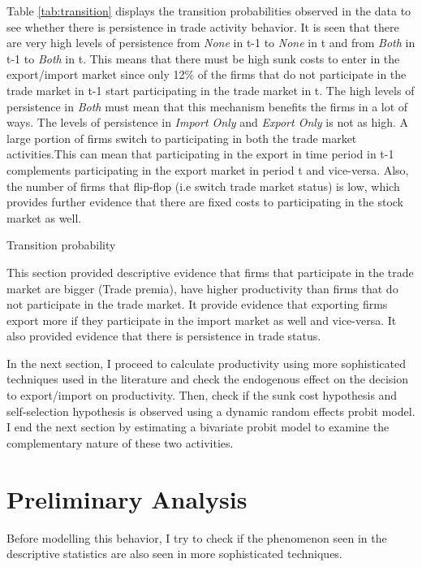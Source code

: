 \documentclass[11pt]{article}
\begin{document}
Table \ref{tab:transition} displays the transition probabilities
observed in the data to see whether there is persistence in trade
activity behavior. It is seen that there are very high levels of persistence from
\textit{None} in t-1 to \textit{None} in t  and from \textit{Both} in
t-1 to \textit{Both} in t. This means that there must be high sunk
costs to enter in the export/import market since only 12\% of the
firms  that do not participate in the trade market in t-1 start
participating in the trade market in t. The high levels of persistence
in \textit{Both} must mean that this mechanism benefits the firms in a
lot of ways. The levels of persistence in \textit{Import Only} and \textit{Export Only}  is not as high. A large
portion of firms switch to participating in both the trade market
activities.This can mean that participating in the export in time
period in t-1 complements participating in the export market in period
t and vice-versa. Also, the number of firms that flip-flop (i.e switch
trade market status) is low, which provides further evidence that there are fixed costs
to participating in the stock market as well. 
\begin{center}
\begin{table}[!htp]
\caption{Transition probability}
\label{tab:transition}

\end{table}
\end{center}


This section provided descriptive evidence that firms that participate
in the trade market are bigger (Trade premia), have higher
productivity than firms that do not participate in the trade
market. It provide evidence that exporting firms export more if they
participate in the import market as well and vice-versa. It also
provided evidence that there is persistence in trade status. 

In the next section, I proceed to calculate productivity using more
sophisticated techniques used in the literature and check the endogenous effect
on the decision to export/import on productivity. Then, check if the
sunk cost hypothesis and self-selection hypothesis is observed using a
dynamic random effects probit model. I end the next section by
estimating a bivariate probit model to examine the complementary
nature of these two activities. 
\section{Preliminary Analysis}
Before modelling this behavior, I try to check if the phenomenon seen
in the descriptive statistics are also seen in more sophisticated
techniques. 
\end{document}
